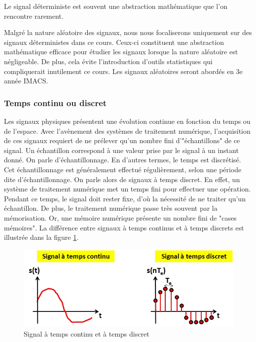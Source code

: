 	Le signal déterministe est souvent une abstraction mathématique que l'on rencontre rarement. 
	
	Malgré la nature aléatoire des signaux, nous nous focaliserons uniquement sur des signaux déterministes dans ce cours. Ceux-ci constituent une abstraction mathématique efficace pour étudier les signaux lorsque la nature aléatoire est négligeable. De plus, cela évite l'introduction d'outils statistiques qui compliquerait inutilement ce cours. Les signaux aléatoires seront abordés en 3e année IMACS.


	\subsubsection{Temps continu ou discret}
	Les signaux physiques présentent une évolution continue en fonction du temps ou de l'espace. Avec l'avènement des systèmes de traitement numérique, l'acquisition de ces signaux requiert de ne prélever qu'un nombre fini d'"échantillons" de ce signal. Un échantillon correspond à une valeur prise par le signal à un instant donné. On parle d'échantillonnage. En d'autres termes, le temps est discrétisé. Cet échantillonnage est généralement effectué régulièrement, selon une période dite d'échantillonnage.
	On parle alors de signaux à temps discret. En effet, un système de traitement numérique met un temps fini pour effectuer une opération. Pendant ce temps, le signal doit rester fixe, d'où la nécessité de ne traiter qu'un échantillon. De plus, le traitement numérique passe très souvent par la mémorisation. Or, une mémoire numérique présente un nombre fini de "cases mémoires". La différence entre signaux à temps continus et à temps discrets est illustrée dans la figure \ref{Fig:Signal_tps_continu_discret}.
	
	\begin{figure}[h!]
          \centering
          \includegraphics[scale=0.5]{images/Signal_tps_continu_discret.jpg} 
		\caption{Signal à temps continu et à temps discret}	
		\label{Fig:Signal_tps_continu_discret}
	\end{figure}
	
